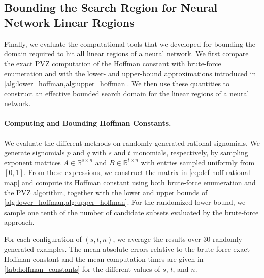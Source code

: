 \documentclass[10pt]{article}
\theoremstyle{definition}
\theoremstyle{remark}
\newcommand{\RR}{{\mathbb{R}}}
\begin{document}
\subsection{Bounding the Search Region for Neural Network Linear Regions}

Finally, we evaluate the computational tools that we developed for bounding the domain required to hit all linear regions of a neural network. We first compare the exact PVZ computation of the Hoffman constant with brute-force enumeration and with the lower- and upper-bound approximations introduced in \cref{alg:lower_hoffman,alg:upper_hoffman}. We then use these quantities to construct an effective bounded search domain for the linear regions of a neural network.

\paragraph{Computing and Bounding Hoffman Constants.} We evaluate the different methods on randomly generated rational signomials. We generate signomials $p$ and $q$ with $s$ and $t$ monomials, respectively, by sampling exponent matrices $A \in \RR^{s \times n}$ and $B \in \RR^{t \times n}$ with entries sampled uniformly from $[0,1]$. From these expressions, we construct the matrix
in \eqref{eq:def-hoff-rational-map} and compute its Hoffman constant using both brute-force enumeration and the PVZ algorithm, together with the lower and upper bounds of \cref{alg:lower_hoffman,alg:upper_hoffman}. For the randomized lower bound, we sample one tenth of the number of candidate subsets evaluated by the brute-force approach.

For each configuration of $(s, t, n)$, we average the results over 30 randomly generated examples. The mean absolute errors relative to the brute-force exact Hoffman constant and the mean computation times are given in \cref{tab:hoffman_constants} for the different values of $s$, $t$, and $n$.
\end{document}
